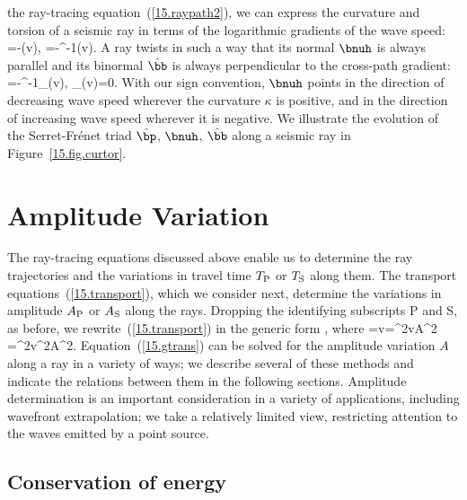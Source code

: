 the ray-tracing equation~(\ref{15.raypath2}),
we can express the curvature and torsion of a
seismic ray in terms of the logarithmic gradients of
the wave speed:
\eq \label{15.kappatau}
\kappa=-\bnuh\cdot\bdel(\ln v),\qquad
\tau=-\kappa^{-1}\hat{\bp}\cdot\bdel\bdel(\ln v)\cdot\hat{\bb}.
\en
A ray twists in such a way that its normal $\bnuh$ is always
parallel and its binormal $\hat{\bb}$ is always perpendicular
to the cross-path gradient:
\eq \label{15.Frenlast}
\bnuh=-\kappa^{-1}\bdel_{\!\perp}(\ln v),\qquad
\hat{\bb}\cdot\bdel_{\!\perp}(\ln v)=0.
\en
With our sign convention, $\bnuh$ points in the direction
of decreasing wave speed wherever the curvature $\kappa$
is positive, and in the direction of increasing wave speed
wherever it is negative.  We illustrate the evolution
of the Serret-Fr\'{e}net triad $\hat{\bp}$, $\bnuh$, $\hat{\bb}$
along a seismic ray in Figure~\ref{15.fig.curtor}.
%
%
%
%
%

\section{Amplitude Variation}
%
%

The ray-tracing equations discussed above enable us to
determine the ray trajectories and the variations in
travel time $T_{\rm P}$ or $T_{\rm S}$ along them.
The transport equations~(\ref{15.transport}),
which we consider next, determine the variations
in amplitude $A_{\rm P}$ or $A_{\rm S}$ along
the rays.  Dropping the identifying subscripts P and S,
as before, we rewrite~(\ref{15.transport})
in the generic form
\eq \label{15.gtrans}
\bdel\cdot{},
\en
where
\eq \label{15.genKdef}
\bsK=v\sE\hat{\bp}=\om^2\rho vA^2\hat{\bp}
=\om^2\rho v^2A^2\bp.
\en
Equation~(\ref{15.gtrans}) can be solved for the amplitude
variation $A$ along a ray in a variety of ways;
we describe several of these methods and indicate
the relations between them in the following sections.
Amplitude determination is an important consideration in a
variety of applications, including wavefront extrapolation;
we take a relatively limited view, restricting attention to
the waves emitted by a point source. 

\subsection{Conservation of energy}
%
%


